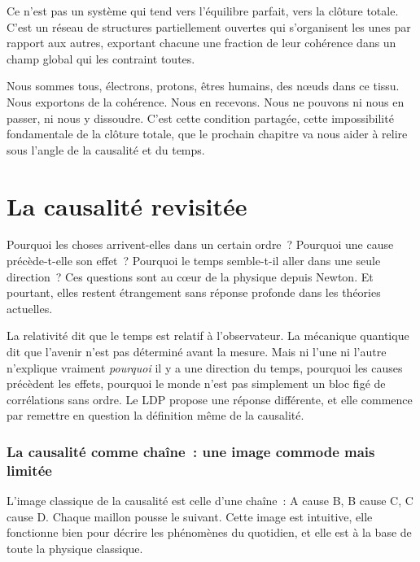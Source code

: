 \documentclass[12pt, a4paper, openright]{book}
\begin{document}
Ce n'est pas un système qui tend vers l'équilibre parfait, vers la clôture totale. C'est un réseau de structures partiellement ouvertes qui s'organisent les unes par rapport aux autres, exportant chacune une fraction de leur cohérence dans un champ global qui les contraint toutes.

\medskip

Nous sommes tous, électrons, protons, êtres humains, des n\oe{}uds dans ce tissu. Nous exportons de la cohérence. Nous en recevons. Nous ne pouvons ni nous en passer, ni nous y dissoudre. C'est cette condition partagée, cette impossibilité fondamentale de la clôture totale, que le prochain chapitre va nous aider à relire sous l'angle de la causalité et du temps.

\chapter{La causalité revisitée}

Pourquoi les choses arrivent-elles dans un certain ordre~? Pourquoi une cause précède-t-elle son effet~? Pourquoi le temps semble-t-il aller dans une seule direction~? Ces questions sont au c\oe{}ur de la physique depuis Newton. Et pourtant, elles restent étrangement sans réponse profonde dans les théories actuelles.

\medskip

La relativité dit que le temps est relatif à l'observateur. La mécanique quantique dit que l'avenir n'est pas déterminé avant la mesure. Mais ni l'une ni l'autre n'explique vraiment \emph{pourquoi} il y a une direction du temps, pourquoi les causes précèdent les effets, pourquoi le monde n'est pas simplement un bloc figé de corrélations sans ordre. Le LDP propose une réponse différente, et elle commence par remettre en question la définition même de la causalité.

\subsection*{La causalité comme chaîne~: une image commode mais limitée}

L'image classique de la causalité est celle d'une chaîne~: A cause B, B cause C, C cause D. Chaque maillon pousse le suivant. Cette image est intuitive, elle fonctionne bien pour décrire les phénomènes du quotidien, et elle est à la base de toute la physique classique.

\medskip
\end{document}
